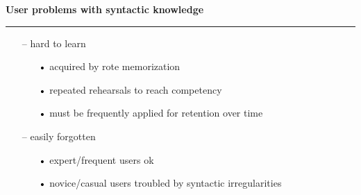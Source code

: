 \documentclass[pdf]{beamer}
\begin{document}
\begin{frame}
\vspace{8mm}
\textcolor{myBlue}{\textbf{\Large{User problems with syntactic knowledge}}}

\textcolor{red}{\rule{10cm}{1mm}}

\begin{small}

	\begin{itemize}
    \item[\textcolor{black}{--}] hard to learn
          \begin{itemize}
		  \item[\textcolor{black}{•}] acquired by rote memorization
          \item[\textcolor{black}{•}] repeated rehearsals to reach competency
          \item[\textcolor{black}{•}] must be frequently applied for retention over time
          \end{itemize}
    \item[\textcolor{black}{--}] easily forgotten
          \begin{itemize}
	      \item[\textcolor{black}{•}] expert/frequent users ok
          \item[\textcolor{black}{•}] novice/casual users troubled by syntactic irregularities         \end{itemize}
	\end{itemize}
    
\medskip
\end{small}
\end{frame}
\end{document}
